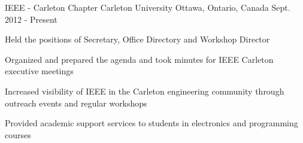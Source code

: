 

\begin{cventries}

  \cventry
    {IEEE - Carleton Chapter} %
    {Carleton University} %
    {Ottawa, Ontario, Canada} %
    {Sept. 2012 - Present} %
    {
      \begin{cvitems} %
        \item {Held the positions of Secretary, Office Directory and Workshop Director}
        \item {Organized and prepared the agenda and took minutes for IEEE Carleton executive meetings}
        \item {Increased visibility of IEEE in the Carleton engineering community through outreach events and regular workshops}
        \item {Provided academic support services to students in electronics and programming courses}
      \end{cvitems}
    }

\end{cventries}
